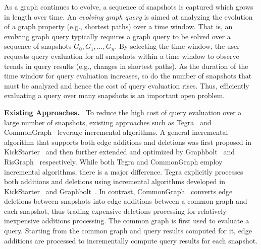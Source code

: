 As a graph continues to evolve, a sequence of snapshots is captured which grows in length over time. An \emph{evolving graph query} is aimed at analyzing the evolution of a graph property (e.g., shortest paths) over a time window. That is, an evolving graph query typically requires a graph query to be solved over a sequence of snapshots $G_0, G_{1}, \ldots, G_{n}$. By selecting the time window, the user requests query evaluation for all snapshots within a time window to observe trends in query results (e.g., changes in shortest paths). As the duration of the time window for query evaluation increases, so do the number of snapshots that must be analyzed and hence the cost of query evaluation rises. Thus, efficiently evaluating a query over many snapshots is an important open problem.

\vspace{0.05in}
\noindent
\textbf{Existing Approaches.~} To reduce the high cost of query evaluation over a large number of snapshots, existing approaches such as Tegra~\cite{tegra} and CommonGraph~\cite{CommonGraph} leverage incremental algorithms. A general incremental algorithm that supports both edge additions and deletions was first proposed in KickStarter~\cite{kickstarter} and then further extended and optimized by Graphbolt~\cite{graphbolt} and RisGraph~\cite{risgraph} respectively. While both Tegra and CommonGraph employ incremental algorithms, there is a major difference. Tegra explicitly processes both additions and deletions using incremental algorithms developed in KickStarter~\cite{kickstarter} and Graphbolt~\cite{graphbolt}. In contrast, CommonGraph~\cite{CommonGraph} converts edge deletions between snapshots into edge additions between a common graph and each snapshot, thus trading expensive deletions processing for relatively inexpensive additions processing. The common graph is first used to evaluate a query. Starting from the common graph and query results computed for it, edge additions are processed to incrementally compute query results for each snapshot. 


